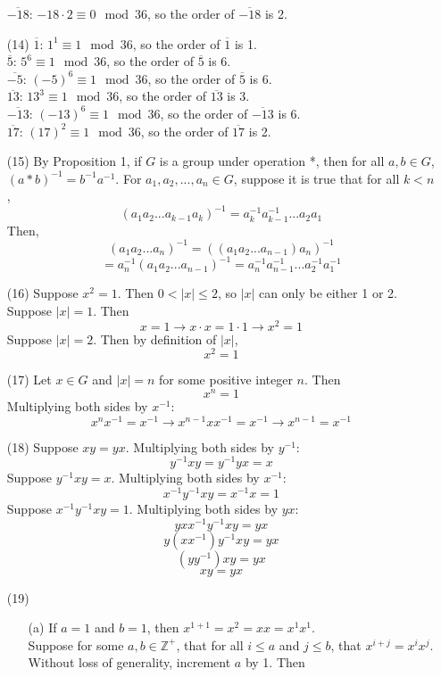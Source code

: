 \documentclass[12pt]{article}
\begin{document}
\begin{itemize}
$\overline{-18}$: $-18 \cdot 2 \equiv 0 \mod 36$, so the order of $\overline{-18}$ is 2.
\item[(14)]
$\overline{1}$: $1^1 \equiv 1 \mod 36$, so the order of $\overline{1}$ is 1. \\
$\overline{5}$: $5^6 \equiv 1 \mod 36$, so the order of $\overline{5}$ is 6. \\
$\overline{-5}$: $(-5)^6 \equiv 1 \mod 36$, so the order of $\overline{5}$ is 6. \\
$\overline{13}$: $13^3 \equiv 1 \mod 36$, so the order of $\overline{13}$ is 3. \\
$\overline{-13}$: $(-13)^6 \equiv 1 \mod 36$, so the order of $\overline{-13}$ is 6. \\
$\overline{17}$: $(17)^2 \equiv 1 \mod 36$, so the order of $\overline{17}$ is 2.
\item[(15)]
By Proposition 1, if $G$ is a group under operation *, then for all $a, b \in G$, $(a * b)^{-1} = b^{-1}a^{-1}$. For $a_1, a_2, ..., a_n \in G$, suppose it is true that for all $k < n$,
$$(a_1a_2...a_{k-1}a_k)^{-1} = a_k^{-1}a_{k-1}^{-1}...a_2a_1$$
Then,
$$(a_1a_2...a_n)^{-1} = ((a_1a_2...a_{n-1})a_n)^{-1}$$ 
$$= a_n^{-1}(a_1a_2...a_{n-1})^{-1} = a_n^{-1}a_{n-1}^{-1}...a_2^{-1}a_1^{-1}$$
\item[(16)]
Suppose $x^2 = 1$. Then $0 < |x| \leq 2$, so $|x|$ can only be either 1 or 2. \\
Suppose $|x| = 1$. Then 
$$x = 1 \rightarrow x \cdot x = 1 \cdot 1 \rightarrow x^2 = 1$$
Suppose $|x| = 2$. Then by definition of $|x|$,
$$x^2 = 1$$
\item[(17)]
Let $x \in G$ and $|x| = n$ for some positive integer $n$. Then
$$x^n = 1$$
Multiplying both sides by $x^{-1}$:
$$x^nx^{-1} = x^{-1} \rightarrow x^{n-1}xx^{-1} = x^{-1} \rightarrow x^{n-1} = x^{-1}$$
\item[(18)]
Suppose $xy = yx$. Multiplying both sides by $y^{-1}$:
$$y^{-1}xy = y^{-1}yx = x$$
Suppose $y^{-1}xy = x$. Multiplying both sides by $x^{-1}$:
$$x^{-1}y^{-1}xy = x^{-1}x = 1$$
Suppose $x^{-1}y^{-1}xy = 1$. Multiplying both sides by $yx$:
$$yxx^{-1}y^{-1}xy = yx$$
$$y(xx^{-1})y^{-1}xy = yx$$
$$(yy^{-1})xy = yx$$
$$xy = yx$$
\item[(19)]
\begin{itemize}
\item[(a)]
If $a = 1$ and $b = 1$, then $x^{1 + 1} = x^2 = xx = x^1x^1$. \\
Suppose for some $a, b \in \mathbb{Z}^+$, that for all $i \leq a$ and $j \leq b$, that $x^{i + j} = x^ix^j$. Without loss of generality, increment $a$ by 1. Then

\end{itemize}
\end{itemize}
\end{document}

